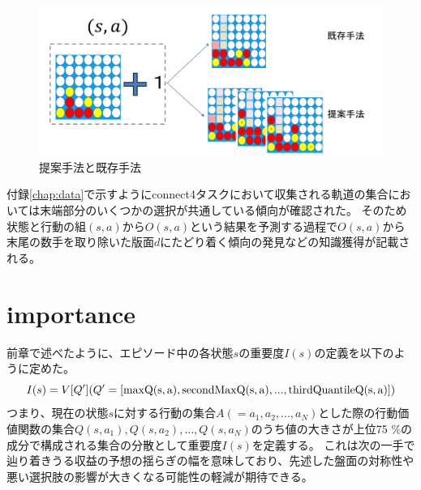 \begin{figure}[t]
    \includegraphics[trim={0cm 0cm 0cm 0cm},clip]{./figure/merit.png}
	\caption{提案手法と既存手法}
	\label{fig:merit}
\end{figure}




付録\ref{chap:data}で示すようにconnect4タスクにおいて収集される軌道の集合においては末端部分のいくつかの選択が共通している傾向が確認された。
そのため状態と行動の組$(s, a)$から$O(s, a)$という結果を予測する過程で$O(s, a)$から末尾の数手を取り除いた版面$d$にたどり着く傾向の発見などの知識獲得が記載される。
\section{importance}
前章で述べたように、エピソード中の各状態$s$の重要度$I(s)$の定義を以下のように定めた。
\begin{equation}
    \label{new-imp}
	{I(s)=V[Q'] (Q'=[\rm{max}Q(s, a), \rm{secondMax}Q(s, a), ..., \rm{thirdQuantile}Q(s, a)])}
\end{equation}
つまり、現在の状態$s$に対する行動の集合$A(={a_1, a_2, ..., a_N})$とした際の行動価値関数の集合${Q(s, a_1), Q(s, a_2), ..., Q(s, a_N)}$のうち値の大きさが上位75
\%の成分で構成される集合の分散として重要度$I(s)$を定義する。
これは次の一手で辿り着きうる収益の予想の揺らぎの幅を意味しており、先述した盤面の対称性や悪い選択肢の影響が大きくなる可能性の軽減が期待できる。

